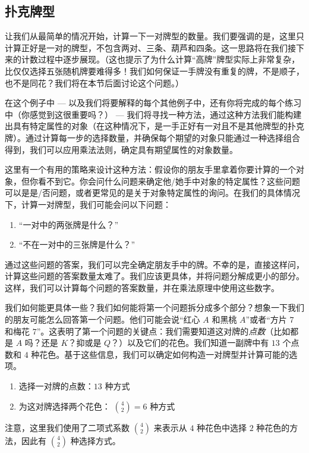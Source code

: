 
\subsection{扑克牌型}

\begin{example}[一对]

    让我们从最简单的情况开始，计算一下一对牌型的数量。我们要强调的是，这里只计算正好是一对的牌型，不包含两对、三条、葫芦和四条。这一思路将在我们接下来的计数过程中逐步展现。（这也提示了为什么计算``高牌''牌型实际上非常复杂，比仅仅选择五张随机牌要难得多！我们如何保证一手牌没有重复的牌，不是顺子，也不是同花？我们将在本节后面讨论这个问题。）

    在这个例子中 --- 以及我们将要解释的每个其他例子中，还有你将完成的每个练习中（你感觉到这很重要吗？） --- 我们将寻找一种方法，通过这种方法我们能构建出具有特定属性的对象（在这种情况下，是一手正好有一对且不是其他牌型的扑克牌）。通过计算每一步的选择数量，并确保每个期望的对象只能通过一种选择组合得到，我们可以应用乘法法则，确定具有期望属性的对象数量。

    这里有一个有用的策略来设计这种方法：假设你的朋友手里拿着你要计算的一个对象，但你看不到它。你会问什么问题来确定他/她手中对象的特定属性？这些问题可以是是/否问题，或者更常见的是关于对象特定属性的询问。在我们的具体情况下，计算一对牌型，我们可能会问以下问题：
    \begin{enumerate}[label=(\arabic*)]
        \item ``一对中的两张牌是什么？''
        \item ``不在一对中的三张牌是什么？''
    \end{enumerate}
    通过这些问题的答案，我们可以完全确定朋友手中的牌。不幸的是，直接这样问，计算这些问题的答案数量太难了。我们应该更具体，并将问题分解成更小的部分。这样，我们可以计算每个问题的答案数量，并在乘法原理中使用这些数字。

    我们如何能更具体一些？我们如何能将第一个问题拆分成多个部分？想象一下我们的朋友可能怎么回答第一个问题。他们可能会说``红心 $A$ 和黑桃 $A$''或者``方片 $7$ 和梅花 $7$''。这表明了第一个问题的关键点：我们需要知道这对牌的\emph{点数}（比如都是 $A$ 吗？还是 $K$？抑或是 $Q$？）以及它们的花色。我们知道一副牌中有 $13$ 个点数和 $4$ 种花色。基于这些信息，我们可以确定如何构造一对牌型并计算可能的选项。
    \begin{enumerate}
        \item 选择一对牌的点数：$13$ 种方式
        \item 为这对牌选择两个花色： ${4 \choose 2} = 6$ 种方式
    \end{enumerate}
    注意，这里我们使用了二项式系数 ${4 \choose 2}$ 来表示从 $4$ 种花色中选择 $2$ 种花色的方法，因此有 ${4 \choose 2}$ 种选择方式。


\end{example}
